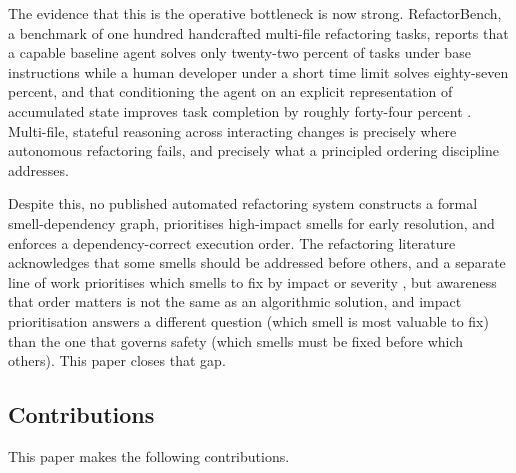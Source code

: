 \documentclass[journal,onecolumn,11pt]{IEEEtran}
\begin{document}
The evidence that this is the operative bottleneck is now strong. RefactorBench, a benchmark of one hundred handcrafted multi-file refactoring tasks, reports that a capable baseline agent solves only twenty-two percent of tasks under base instructions while a human developer under a short time limit solves eighty-seven percent, and that conditioning the agent on an explicit representation of accumulated state improves task completion by roughly forty-four percent \cite{gautam2025}. Multi-file, stateful reasoning across interacting changes is precisely where autonomous refactoring fails, and precisely what a principled ordering discipline addresses.

Despite this, no published automated refactoring system constructs a formal smell-dependency graph, prioritises high-impact smells for early resolution, and enforces a dependency-correct execution order. The refactoring literature acknowledges that some smells should be addressed before others, and a separate line of work prioritises which smells to fix by impact or severity \cite{vidal2016}, but awareness that order matters is not the same as an algorithmic solution, and impact prioritisation answers a different question (which smell is most valuable to fix) than the one that governs safety (which smells must be fixed before which others). This paper closes that gap.

\subsection{Contributions}
This paper makes the following contributions.
\end{document}
